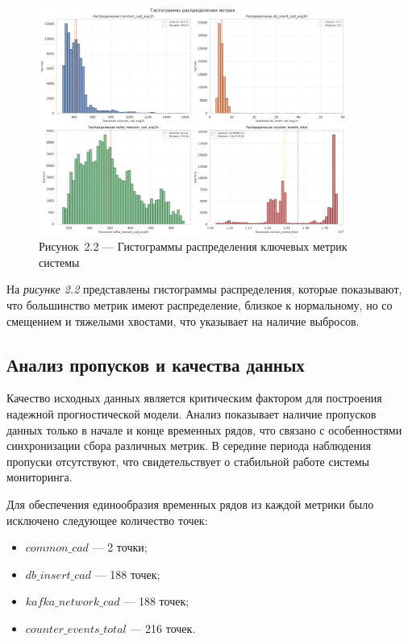\begin{figure}[H]
	\centering
	\includegraphics[width=0.9\textwidth]{figures/chapter2/metrics_distribution.png}
	\caption*{Рисунок~2.2 --- Гистограммы распределения ключевых метрик системы}
	\label{fig:metrics_distribution}
\end{figure}

На \textit{рисунке 2.2} представлены гистограммы распределения, которые показывают, что большинство метрик имеют распределение, близкое к нормальному, но со смещением и тяжелыми хвостами, что указывает на наличие выбросов.

\subsection{Анализ пропусков и качества данных}

Качество исходных данных является критическим фактором для построения надежной прогностической модели. Анализ показывает наличие пропусков данных только в начале и конце временных рядов, что связано с особенностями синхронизации сбора различных метрик. В середине периода наблюдения пропуски отсутствуют, что свидетельствует о стабильной работе системы мониторинга.

Для обеспечения единообразия временных рядов из каждой метрики было исключено следующее количество точек:

\begin{itemize}
	\item $common\_cad$ --- 2 точки;
	\item $db\_insert\_cad$ --- 188 точек;
	\item $kafka\_network\_cad$ --- 188 точек;
	\item $counter\_events\_total$ --- 216 точек.
\end{itemize}

